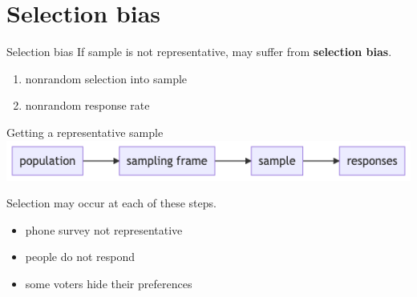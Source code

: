 \documentclass[
  ignorenonframetext,
  aspectratio=54,
]{beamer}
\providecommand{\tightlist}{%
  \setlength{\itemsep}{0pt}\setlength{\parskip}{0pt}}
\begin{document}
\hypertarget{selection-bias}{%
\section{Selection bias}\label{selection-bias}}

\begin{frame}{Selection bias}
\protect\hypertarget{selection-bias-1}{}
If sample is not representative, may suffer from \textbf{selection
bias}.

\begin{enumerate}
\tightlist
\item
  nonrandom selection into sample
\item
  nonrandom response rate
\end{enumerate}
\end{frame}

\begin{frame}{Getting a representative sample}
\protect\hypertarget{getting-a-representative-sample}{}
\includegraphics{exhibit/fig/selection-bias.png}

Selection may occur at each of these steps.

\begin{itemize}
\tightlist
\item
  phone survey not representative
\item
  people do not respond
\item
  some voters hide their preferences
\end{itemize}
\end{frame}
\end{document}
